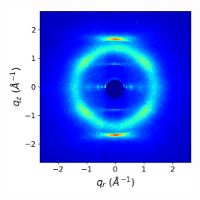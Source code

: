 \documentclass[journal=jpcbfk,manusciprt=article]{achemso}
\begin{document}
\begin{figure}[!htb]
\begin{subfigure}{0.88\textwidth}
\begin{subfigure}{0.28\linewidth}
\begin{subfigure}{\textwidth}
			\end{subfigure}
	\end{subfigure}
	\begin{subfigure}{0.4\linewidth}
	\centering
			\begin{subfigure}{\textwidth}
		       		\centering
	        		\includegraphics[width=\linewidth]{WAXS_raw_jet_nocbar.png}
			\end{subfigure}
	\end{subfigure}
	\begin{subfigure}{0.28\linewidth}
	\centering
			\begin{subfigure}{\textwidth}
			\centering

\end{subfigure}
\end{subfigure}
\end{subfigure}
\end{figure}
\end{document}
